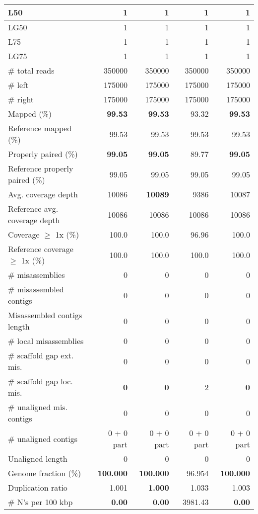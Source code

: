 \documentclass[12pt,a4paper]{article}
\begin{document}
\begin{table}[ht]
\begin{center}
\begin{tabular}{|l*{4}{|r}|}
L50 & 1 & 1 & 1 & 1 \\ \hline
LG50 & 1 & 1 & 1 & 1 \\ \hline
L75 & 1 & 1 & 1 & 1 \\ \hline
LG75 & 1 & 1 & 1 & 1 \\ \hline
\# total reads & 350000 & 350000 & 350000 & 350000 \\ \hline
\# left & 175000 & 175000 & 175000 & 175000 \\ \hline
\# right & 175000 & 175000 & 175000 & 175000 \\ \hline
Mapped (\%) & {\bf 99.53} & {\bf 99.53} & 93.32 & {\bf 99.53} \\ \hline
Reference mapped (\%) & 99.53 & 99.53 & 99.53 & 99.53 \\ \hline
Properly paired (\%) & {\bf 99.05} & {\bf 99.05} & 89.77 & {\bf 99.05} \\ \hline
Reference properly paired (\%) & 99.05 & 99.05 & 99.05 & 99.05 \\ \hline
Avg. coverage depth & 10086 & {\bf 10089} & 9386 & 10087 \\ \hline
Reference avg. coverage depth & 10086 & 10086 & 10086 & 10086 \\ \hline
Coverage $\geq$ 1x (\%) & 100.0 & 100.0 & 96.96 & 100.0 \\ \hline
Reference coverage $\geq$ 1x (\%) & 100.0 & 100.0 & 100.0 & 100.0 \\ \hline
\# misassemblies & 0 & 0 & 0 & 0 \\ \hline
\# misassembled contigs & 0 & 0 & 0 & 0 \\ \hline
Misassembled contigs length & 0 & 0 & 0 & 0 \\ \hline
\# local misassemblies & 0 & 0 & 0 & 0 \\ \hline
\# scaffold gap ext. mis. & 0 & 0 & 0 & 0 \\ \hline
\# scaffold gap loc. mis. & {\bf 0} & {\bf 0} & 2 & {\bf 0} \\ \hline
\# unaligned mis. contigs & 0 & 0 & 0 & 0 \\ \hline
\# unaligned contigs & 0 + 0 part & 0 + 0 part & 0 + 0 part & 0 + 0 part \\ \hline
Unaligned length & 0 & 0 & 0 & 0 \\ \hline
Genome fraction (\%) & {\bf 100.000} & {\bf 100.000} & 96.954 & {\bf 100.000} \\ \hline
Duplication ratio & 1.001 & {\bf 1.000} & 1.033 & 1.003 \\ \hline
\# N's per 100 kbp & {\bf 0.00} & {\bf 0.00} & 3981.43 & {\bf 0.00} \\ \hline

\end{tabular}
\end{center}
\end{table}
\end{document}
